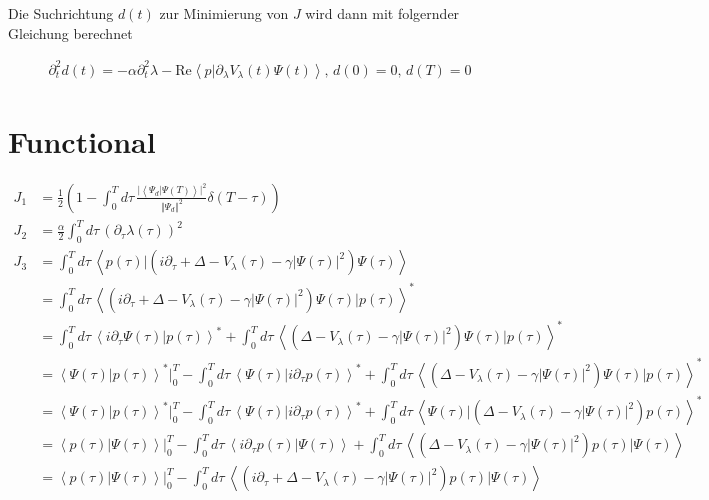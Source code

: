 \documentclass[10pt,a4paper]{article}
\newcommand{\iu}{\ensuremath{i}}
\newcommand{\intT}{\ensuremath{\int_0^T d\tau\,}}
\newcommand{\skalarprodukt}[2]{\left< #1 \vert #2 \right>}
\begin{document}
Die Suchrichtung $d(t)$ zur Minimierung von $J$ wird dann mit folgernder Gleichung berechnet

\begin{align}
\partial_t^2 d(t) = - \alpha \partial_t^2 \lambda -\text{Re} \skalarprodukt{p}{\partial_{\lambda} V_{\lambda}(t) \Psi(t)} \text{,  } d(0)=0 \text{, } d(T)=0 
\end{align}


\section{Functional}

\begin{align}
J_1 &= \frac{1}{2} \left( 1 - \intT \frac{\vert\skalarprodukt{\Psi_d}{\Psi(T)}\vert^2}{\Vert \Psi_d \Vert^2} \delta(T-\tau) \right) \\
J_2 &= \frac{\alpha}{2} \intT \left( \partial_{\tau} \lambda(\tau) \right)^2 \\
J_3 &= \intT \skalarprodukt{p(\tau)}{\left( \iu \partial_{\tau} + \Delta - V_{\lambda}(\tau) - \gamma \vert \Psi(\tau) \vert^2 \right)\Psi(\tau)} \\
&= \intT \skalarprodukt{\left( \iu \partial_{\tau} + \Delta - V_{\lambda}(\tau) - \gamma \vert \Psi(\tau) \vert^2 \right)\Psi(\tau)}{p(\tau)}^* \\
&= \intT \skalarprodukt{\iu \partial_{\tau} \Psi(\tau)}{p(\tau)}^* + \intT \skalarprodukt{\left( \Delta - V_{\lambda}(\tau) - \gamma \vert \Psi(\tau) \vert^2 \right)\Psi(\tau)}{p(\tau)}^* \\
&= \skalarprodukt{\Psi(\tau)}{p(\tau)}^*\vert_0^T - \intT \skalarprodukt{\Psi(\tau)}{\iu \partial_{\tau} p(\tau)}^* + \intT \skalarprodukt{\left( \Delta - V_{\lambda}(\tau) - \gamma \vert \Psi(\tau) \vert^2 \right)\Psi(\tau)}{p(\tau)}^* \\
&= \skalarprodukt{\Psi(\tau)}{p(\tau)}^*\vert_0^T - \intT \skalarprodukt{\Psi(\tau)}{\iu \partial_{\tau} p(\tau)}^* + \intT \skalarprodukt{\Psi(\tau)}{\left( \Delta - V_{\lambda}(\tau) - \gamma \vert \Psi(\tau) \vert^2 \right) p(\tau)}^* \\
&= \skalarprodukt{p(\tau)}{\Psi(\tau)} \vert_0^T - \intT \skalarprodukt{\iu \partial_{\tau} p(\tau)}{\Psi(\tau)} + \intT \skalarprodukt{\left( \Delta - V_{\lambda}(\tau) - \gamma \vert \Psi(\tau) \vert^2 \right) p(\tau)}{\Psi(\tau)} \\
&= \skalarprodukt{p(\tau)}{\Psi(\tau)} \vert_0^T - \intT \skalarprodukt{\left(\iu \partial_{\tau} + \Delta - V_{\lambda}(\tau) - \gamma \vert \Psi(\tau) \vert^2 \right) p(\tau)}{\Psi(\tau)}
\end{align}
\end{document}
